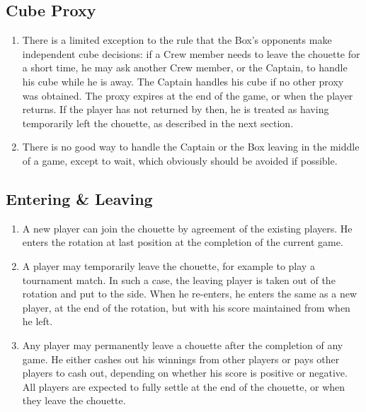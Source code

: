 \documentclass[11pt]{article}
\begin{document}
\subsection*{Cube Proxy}

\begin{enumerate}
\item There is a limited exception to the rule that the Box's
  opponents make independent cube decisions: if a Crew member needs to
  leave the chouette for a short time, he may ask another Crew member,
  or the Captain, to handle his cube while he is away.  The Captain
  handles his cube if no other proxy was obtained.  The proxy expires
  at the end of the game, or when the player returns.  If the player
  has not returned by then, he is treated as having temporarily left
  the chouette, as described in the next section.

\item There is no good way to handle the Captain or the Box leaving in
  the middle of a game, except to wait, which obviously should be
  avoided if possible.

\end{enumerate}

\subsection*{Entering \& Leaving}

\begin{enumerate}
\item A new player can join the chouette by agreement of the existing
  players.  He enters the rotation at last position at the completion of
  the current game.

\item A player may temporarily leave the chouette, for example to play
  a tournament match.  In such a case, the leaving player is taken out
  of the rotation and put to the side.  When he re-enters, he enters
  the same as a new player, at the end of the rotation, but with his
  score maintained from when he left.

\item Any player may permanently leave a chouette after the completion
  of any game. He either cashes out his winnings from other players or
  pays other players to cash out, depending on whether his score is
  positive or negative.  All players are expected to fully settle at
  the end of the chouette, or when they leave the chouette.
\end{enumerate}
\end{document}
